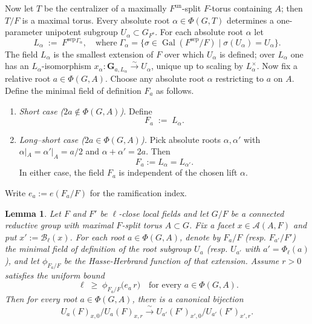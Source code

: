 \documentclass[american]{article}
\numberwithin{equation}{section}
\numberwithin{figure}{section}
\theoremstyle{plain}
\newtheorem{lemma}[theorem]{Lemma}
\theoremstyle{definition}
\theoremstyle{remark}
\DeclareMathOperator{\Gal}{Gal}
\begin{document}
Now let \(T\) be the centralizer of a maximally \(F^{\mathrm{un}}\)-split \(F\)-torus containing
\(A\); then \(T/F\) is a maximal torus.
Every absolute root \(\alpha\in\Phi(G,T)\) determines a
one-parameter unipotent subgroup \(U_\alpha\subset G_{F^{\mathrm s}}\).
For each absolute root \(\alpha\) let
\[
   L_\alpha \;:=\; F^{\mathrm {sep}}{}^{\Gamma_\alpha}, 
   \quad\text{where}\;
   \Gamma_\alpha=\{\sigma\in\Gal(F^{\mathrm {sep}}\!/F)\mid \sigma(U_\alpha)=U_\alpha\}.
\]
The field \(L_\alpha\) is the smallest extension of \(F\) over
which \(U_\alpha\) is defined; over \(L_\alpha\) one has an
\(L_\alpha\)-isomorphism \(x_\alpha:\mathbf G_{a,L_\alpha}\!\xrightarrow\sim\!U_\alpha\),
unique up to scaling by \(L_\alpha^{\times}\).
Now fix a relative root \(a\in\Phi(G,A)\).
Choose any absolute root \(\alpha\) restricting to \(a\) on \(A\). Define the minimal field of definition \(F_a\) as follows.
\begin{enumerate}[label=(\alph*)]
    \item \emph{Short case (\(2a\notin\Phi(G,A)\)).}
          Define
          \[
              F_a \;:=\; L_\alpha .
          \]
    \item \emph{Long--short case (\(2a\in\Phi(G,A)\)).}
          Pick absolute roots \(\alpha,\alpha'\) with
          \(\alpha|_A=\alpha'|_A=a/2\) and \(\alpha+\alpha'=2a\).  
          Then
          \[
              F_{a}:=L_\alpha=L_{\alpha'}.
          \] 
In either case, the field \(F_a\) is independent of the chosen lift \(\alpha\).
\end{enumerate}
Write \(e_a := e(F_a/F)\) for the ramification index.

\begin{lemma}
\label{lem:root-filtration-HH}
Let $F$ and $F'$ be $\ell$-close local fields and let $G/F$ be a connected reductive group with maximal $F$-split torus $A\subset G$. Fix a facet $x\in\mathcal{A}(A,F)$ and put $x':=\mathcal{B}_\ell(x)$. For each root $a\in\Phi(G,A)$, denote by $F_a/F$ (resp. $F_{a'}/F'$) the minimal field of definition of the root subgroup $U_a$ (resp. $U_{a'}$ with $a'=\Phi_\ell(a)$), and let $\phi_{F_a/F}$ be the Hasse-Herbrand function of that extension. Assume $r>0$ satisfies the uniform bound
\[
\; \ell \;\ge\; \phi_{F_a/F}\!\bigl(e_a\,r\bigr) \quad\text{for every }a\in\Phi(G,A). \tag{$\ast$}
\]
Then for every root $a\in\Phi(G,A)$, there is a canonical bijection
\[
  U_a(F)_{x,0}\big/ U_a(F)_{x,r} \xrightarrow{\;\sim\;} U_{a'}(F')_{x',0}\big/ U_{a'}(F')_{x',r}.
\]
\end{lemma}
\end{document}

